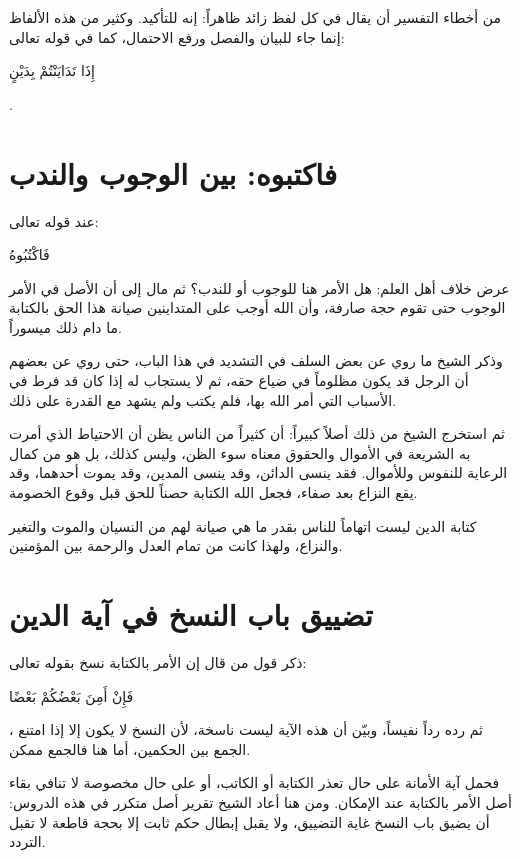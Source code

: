 \begin{fawaid}
من أخطاء التفسير أن يقال في كل لفظ زائد ظاهراً: إنه للتأكيد. وكثير من هذه الألفاظ إنما جاء للبيان والفصل ورفع الاحتمال، كما في قوله تعالى: \begin{ayah}إِذَا تَدَايَنْتُمْ بِدَيْنٍ\end{ayah}.
\end{fawaid}

\section{فاكتبوه: بين الوجوب والندب}
عند قوله تعالى: \begin{ayah}فَاكْتُبُوهُ\end{ayah} عرض  خلاف أهل العلم: هل الأمر هنا للوجوب أو للندب؟ ثم مال إلى أن الأصل في الأمر الوجوب حتى تقوم حجة صارفة، وأن الله أوجب على المتداينين صيانة هذا الحق بالكتابة ما دام ذلك ميسوراً.

وذكر الشيخ ما روي عن بعض السلف في التشديد في هذا الباب، حتى روي عن بعضهم أن الرجل قد يكون مظلوماً في ضياع حقه، ثم لا يستجاب له إذا كان قد فرط في الأسباب التي أمر الله بها، فلم يكتب ولم يشهد مع القدرة على ذلك.

ثم استخرج الشيخ من ذلك أصلاً كبيراً: أن كثيراً من الناس يظن أن الاحتياط الذي أمرت به الشريعة في الأموال والحقوق معناه سوء الظن، وليس كذلك، بل هو من كمال الرعاية للنفوس وللأموال. فقد ينسى الدائن، وقد ينسى المدين، وقد يموت أحدهما، وقد يقع النزاع بعد صفاء، فجعل الله الكتابة حصناً للحق قبل وقوع الخصومة.

\begin{fawaid}
كتابة الدين ليست اتهاماً للناس بقدر ما هي صيانة لهم من النسيان والموت والتغير والنزاع، ولهذا كانت من تمام العدل والرحمة بين المؤمنين.
\end{fawaid}

\section{تضييق باب النسخ في آية الدين}
ذكر  قول من قال إن الأمر بالكتابة نسخ بقوله تعالى: \begin{ayah}فَإِنْ أَمِنَ بَعْضُكُمْ بَعْضًا\end{ayah}، ثم رده رداً نفيساً، وبيّن أن هذه الآية ليست ناسخة، لأن النسخ لا يكون إلا إذا امتنع الجمع بين الحكمين، أما هنا فالجمع ممكن.

فحمل  آية الأمانة على حال تعذر الكتابة أو الكاتب، أو على حال مخصوصة لا تنافي بقاء أصل الأمر بالكتابة عند الإمكان. ومن هنا أعاد الشيخ تقرير أصل متكرر في هذه الدروس: أن  يضيق باب النسخ غاية التضييق، ولا يقبل إبطال حكم ثابت إلا بحجة قاطعة لا تقبل التردد.


